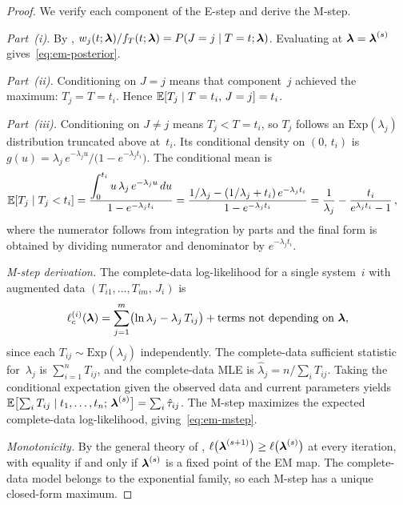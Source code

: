 \begin{proof}
We verify each component of the E-step and derive the M-step.

\smallskip\noindent
\emph{Part~\textup{(i)}.}\enspace
By ,
$w_j(t;\boldsymbol{\lambda})/f_T(t;\boldsymbol{\lambda}) = P(J = j \mid T = t;\boldsymbol{\lambda})$.
Evaluating at $\boldsymbol{\lambda} = \boldsymbol{\lambda}^{(s)}$ gives~\eqref{eq:em-posterior}.

\smallskip\noindent
\emph{Part~\textup{(ii)}.}\enspace
Conditioning on $J = j$ means that component~$j$ achieved the maximum:
$T_j = T = t_i$.  Hence
$\mathbb{E}[T_j \mid T = t_i,\, J = j] = t_i$.

\smallskip\noindent
\emph{Part~\textup{(iii)}.}\enspace
Conditioning on $J \neq j$ means $T_j < T = t_i$, so $T_j$ follows
an $\mathrm{Exp}(\lambda_j)$ distribution truncated above at~$t_i$.
Its conditional density on $(0,\, t_i)$ is
$g(u) = \lambda_j\, e^{-\lambda_j u}\big/\bigl(1 - e^{-\lambda_j t_i}\bigr)$.
The conditional mean is
\begin{align*}
  \mathbb{E}[T_j \mid T_j < t_i]
  &= \frac{\displaystyle\int_0^{t_i} u\,\lambda_j\, e^{-\lambda_j u}\,du}
          {1 - e^{-\lambda_j t_i}}
  = \frac{1/\lambda_j - (1/\lambda_j + t_i)\,e^{-\lambda_j t_i}}
          {1 - e^{-\lambda_j t_i}}
  = \frac{1}{\lambda_j}
    - \frac{t_i}{e^{\lambda_j t_i} - 1}\,,
\end{align*}
where the numerator follows from integration by parts and the final
form is obtained by dividing numerator and denominator by
$e^{-\lambda_j t_i}$.

\smallskip\noindent
\emph{M-step derivation.}\enspace
The complete-data log-likelihood for a single system~$i$ with augmented
data $(T_{i1},\ldots,T_{im},\, J_i)$ is
\[
  \ell_c^{(i)}(\boldsymbol{\lambda})
  = \sum_{j=1}^{m}\bigl(\ln \lambda_j - \lambda_j\, T_{ij}\bigr)
    + \text{terms not depending on~$\boldsymbol{\lambda}$},
\]
since each $T_{ij} \sim \mathrm{Exp}(\lambda_j)$ independently.  The
complete-data sufficient statistic for~$\lambda_j$ is
$\sum_{i=1}^n T_{ij}$, and the complete-data MLE is
$\hat\lambda_j = n \big/ \sum_{i} T_{ij}$.  Taking the conditional
expectation given the observed data and current parameters yields
$\mathbb{E}\bigl[\sum_i T_{ij} \mid t_1,\ldots,t_n;\, \boldsymbol{\lambda}^{(s)}\bigr]
= \sum_i \hat\tau_{ij}$.  The M-step maximizes the expected
complete-data log-likelihood, giving~\eqref{eq:em-mstep}.

\smallskip\noindent
\emph{Monotonicity.}\enspace
By the general theory of \citet{DempsterLairdRubin1977},
$\ell\bigl(\boldsymbol{\lambda}^{(s+1)}\bigr) \geq \ell\bigl(\boldsymbol{\lambda}^{(s)}\bigr)$ at
every iteration, with equality if and only if $\boldsymbol{\lambda}^{(s)}$ is a fixed
point of the EM map.  The complete-data model belongs to the exponential
family, so each M-step has a unique closed-form maximum.
\end{proof}

